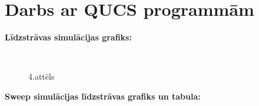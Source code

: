 \documentclass {report}
\begin{document}
    
\section{Darbs ar QUCS programmām}
\textbf{Līdzstrāvas simulācijas grafiks:}

\begin{figure}
\\
\caption{4.attēls}
\label{i:example}
\end{figure}

\textbf{Sweep simulācijas līdzstrāvas grafiks un tabula:}
\end{document}
